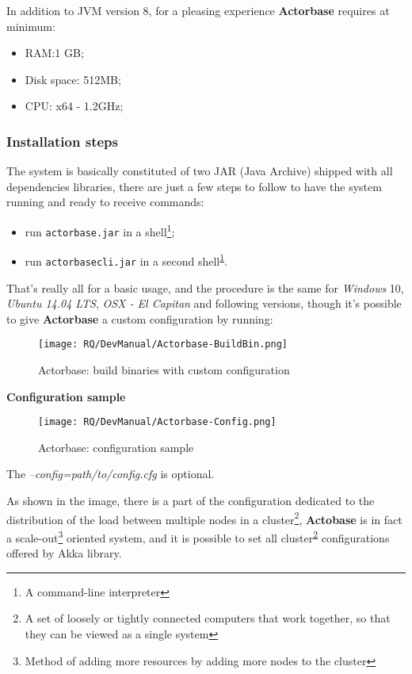 \documentclass{scalatekids-article}
\begin{document}
In addition to JVM version 8, for a pleasing experience \textbf{Actorbase} requires at minimum:
\begin{itemize}
\item RAM:\@1 GB;\@
\item Disk space: 512MB;\@
\item CPU: x64 - 1.2GHz;
\end{itemize}

\subsubsection{Installation steps}

The system is basically constituted of two JAR (Java Archive) shipped with all
dependencies libraries, there are just a few steps to follow to have the system
running and ready to receive commands:
\begin{itemize}
\item run \verb=actorbase.jar= in a shell\footnote{A command-line interpreter\label{shell}};
\item run \verb=actorbasecli.jar= in a second shell\textsuperscript{\ref{shell}}.
\end{itemize}
That's really all for a basic usage, and the procedure is the same for
\textit{Windows} 10, \textit{Ubuntu 14.04 LTS}, \textit{OSX - El
  Capitan} and following versions, though it's possible to give \textbf{Actorbase} a custom configuration by
running:

 \begin{figure}[H]
   \begin{center}
     \texttt{[image: RQ/DevManual/Actorbase-BuildBin.png]}
     \caption{Actorbase: build binaries with custom configuration}
   \end{center}
 \end{figure}

\textbf{Configuration sample}

 \begin{figure}[H]
   \begin{center}
     \texttt{[image: RQ/DevManual/Actorbase-Config.png]}
     \caption{Actorbase: configuration sample}
   \end{center}
 \end{figure}

The \textit{--config=path/to/config.cfg} is optional.

As shown in the image, there is a part of the configuration dedicated to the
distribution of the load between multiple nodes in a cluster\footnote{A set of
loosely or tightly connected computers that work together, so that they can be
viewed as a single system\label{cluster}}, \textbf{Actobase} is in fact a
scale-out\footnote{Method of adding more resources by adding more nodes to the
cluster\label{cleout}} oriented system, and it is possible to set all
cluster\textsuperscript{\ref{cluster}} configurations offered by Akka library.
\end{document}
